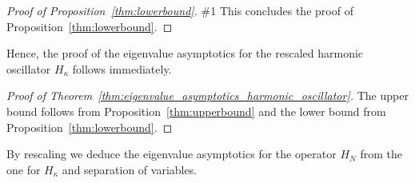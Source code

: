 \documentclass[12pt, reqno]{amsart}
\theoremstyle{definition}
\numberwithin{equation}{section}
\newcommand{\lorenzorrection}[1]{\#1}%
\begin{document}
\begin{proof}[Proof of Proposition~\ref{thm:lowerbound}]
  \lorenzorrection{ Let $r$ be a number such that $2(n-1)+1 < r < 2n+1$ and denote by $P_{N,n-1}$ the projector on the  eigenfunctions of $\widetilde{H}_\kappa$ for eigenvalues less than $\kappa^{2} r$ and $P_{N,0}=0$. By the induction hypothesis, we have that $P_{N,n-1}$ has rank $n-1$ for small enough $\kappa$ and trivially we have that $P_{N,0}$ has rank $0$ (which is the base case of the induction).
    By the eigenvalue lower bound for the modified harmonic oscillator proved in Proposition~\ref{prop:lower_bound_modified} above, we have for the second term  $\eta_1 \tilde H_\kappa \eta_1$ in the IMS localization formula that
   \begin{multline*}
   \eta_1 \tilde H_\kappa \eta_1  = \eta_1 \tilde{H}_\kappa P_{N,n-1}\eta_1 + \eta_1 \tilde{H}_\kappa(I-P_{N,n-1})\eta_1\\
   \ge \kappa^2r \eta_1^2  + \eta_1P_{N,n-1}(\tilde H_\kappa - \kappa^2r)P_{N,n-1}\eta_1+o(\kappa^2)
   \end{multline*}
   for $\kappa$ small enough. We note that $\eta_1 P_{N,n-1}(\tilde H_\kappa - \kappa^2r)P_{N,n-1}\eta_1$ has rank at most $n-1$.\\
   Finally, by the Lipschitz property of $\eta_j$, we have
   \[\| [\eta_j,[  \eta_j,\Delta]]\|\leq 2\cdot 2\cdot (2\kappa^{1+\delta})^2= 16\kappa^{2(1+\delta)}=o(\kappa^2).\]
   Thus, by the min-max principle and $\eta_0^2+\eta_1^2=1$, we have for the $n$-th eigenvalue $E_n(\kappa)$ of $H_\kappa$ 
   \[E_n(\kappa)\geq \kappa^2r+o(\kappa^2).\]
  which yields the desired lower bound since we can choose $r$ arbitrarily close to $2n+1$.} This concludes the proof of Proposition~\ref{thm:lowerbound}.\end{proof}
Hence, the proof of the eigenvalue asymptotics for the rescaled harmonic oscillator $H_\kappa$ follows immediately.
\begin{proof}[Proof of Theorem~\ref{thm:eigenvalue_asymptotics_harmonic_oscillator}]The upper bound follows from Proposition~\ref{thm:upperbound} and the lower bound from Proposition~\ref{thm:lowerbound}.\end{proof}

By rescaling we deduce the eigenvalue asymptotics for the operator $H_N$   from the one for $H_\kappa$ and separation of variables. 
\end{document}
